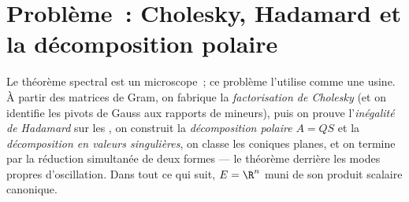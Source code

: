\section{Problème~: Cholesky, Hadamard et la décomposition
polaire}

\begin{problem}\label{pb:b2:quadratic:1}
Le théorème spectral est un microscope~; ce problème l'utilise comme
une usine. À partir des matrices de Gram, on fabrique la
\emph{factorisation de Cholesky}
(et on identifie les pivots de Gauss aux rapports de mineurs), puis
on prouve l'\emph{inégalité de Hadamard} sur les , on construit la \emph{décomposition
polaire} $A = QS$ et la
\emph{décomposition en valeurs singulières}, on classe les coniques
planes, et on termine par la réduction simultanée de deux formes ---
le théorème derrière les modes propres d'oscillation. Dans tout ce
qui suit, $E = \R^n$ muni de son produit scalaire canonique.


\end{problem}
